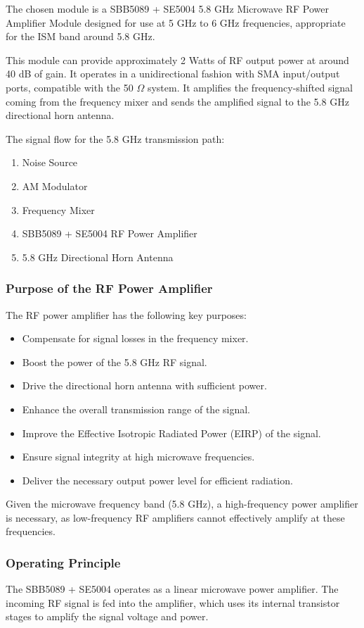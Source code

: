 \documentclass[12pt,a4paper]{report}
\begin{document}
	The chosen module is a SBB5089 + SE5004 5.8 GHz Microwave RF Power Amplifier Module designed for use at 5 GHz to 6 GHz frequencies, appropriate for the ISM band around 5.8 GHz.
	
	This module can provide approximately 2 Watts of RF output power at around 40 dB of gain. It operates in a unidirectional fashion with SMA input/output ports, compatible with the 50 $\Omega$ system. It amplifies the frequency-shifted signal coming from the frequency mixer and sends the amplified signal to the 5.8 GHz directional horn antenna.
	
	The signal flow for the 5.8 GHz transmission path:
	\begin{enumerate}
		\item Noise Source
		\item AM Modulator
		\item Frequency Mixer
		\item SBB5089 + SE5004 RF Power Amplifier
		\item 5.8 GHz Directional Horn Antenna
	\end{enumerate}
	
	\subsubsection{Purpose of the RF Power Amplifier}
	The RF power amplifier has the following key purposes:
	\begin{itemize}
		\item Compensate for signal losses in the frequency mixer.
		\item Boost the power of the 5.8 GHz RF signal.
		\item Drive the directional horn antenna with sufficient power.
		\item Enhance the overall transmission range of the signal.
		\item Improve the Effective Isotropic Radiated Power (EIRP) of the signal.
		\item Ensure signal integrity at high microwave frequencies.
		\item Deliver the necessary output power level for efficient radiation.
	\end{itemize}
	
	Given the microwave frequency band (5.8 GHz), a high-frequency power amplifier is necessary, as low-frequency RF amplifiers cannot effectively amplify at these frequencies.
	\subsubsection{Operating Principle}
	The SBB5089 + SE5004 operates as a linear microwave power amplifier. The incoming RF signal is fed into the amplifier, which uses its internal transistor stages to amplify the signal voltage and power.
	
\end{document}
